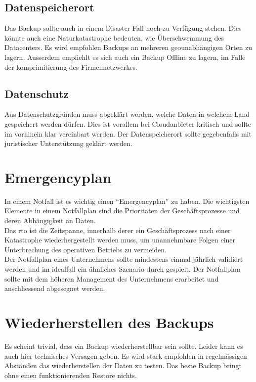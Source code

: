 \subsection{Datenspeicherort}
Das Backup sollte auch in einem Disaster Fall noch zu Verfügung stehen.
Dies könnte auch eine Naturkatastrophe bedeuten, wie Überschwemmung des Datacenters.
Es wird empfohlen Backups an mehreren geounabhängigen Orten zu lagern.
Ausserdem empfiehlt es sich auch ein Backup Offline zu lagern, im Falle der komprimitierung des Firmennetzwerkes.



\subsection{Datenschutz}
Aus Datenschutzgründen muss abgeklärt werden, welche Daten in welchem Land gespeichert werden dürfen.
Dies ist vorallem bei Cloudanbieter kritisch und sollte im vorhinein klar vereinbart werden.
Der Datenspeicherort sollte gegebenfalls mit juristischer Unterstützung geklärt werden.

\section{Emergencyplan}
In einem Notfall ist es wichtig einen ``Emergencyplan'' zu haben.
Die wichtigsten Elemente in einem Notfallplan sind die Prioritäten der Geschäftsprozesse und deren Abhängigkeit an Daten.\\


Das \acrfull{rto} ist die Zeitspanne, innerhalb derer ein Geschäftsprozess nach einer Katastrophe wiederhergestellt werden muss, um unannehmbare Folgen einer Unterbrechung des operativen Betriebs zu vermeiden.\\

Der Notfallplan eines Unternehmens sollte mindestens einmal jährlich validiert werden und im idealfall ein ähnliches Szenario durch gespielt.
Der Notfallplan sollte mit dem höheren Management des Unternehmens erarbeitet und anschliessend abgesegnet werden.


\section{Wiederherstellen des Backups}
Es scheint trivial, dass ein Backup wiederherstellbar sein sollte.
Leider kann es auch hier technisches Versagen geben.
Es wird stark empfohlen in regelmässigen Abständen das wiederherstellen der Daten zu testen.
Das beste Backup bringt ohne einen funktionierenden Restore nichts.